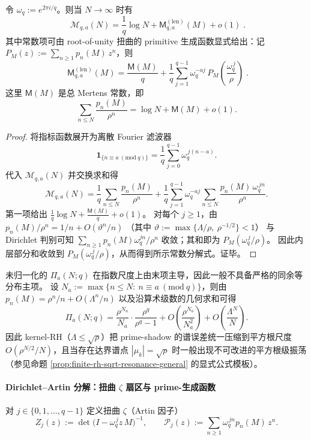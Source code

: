 \begin{theorem}\label{thm:zeta-length-modq-chebotarev-mertens}
令 \(\omega_q:=e^{2\pi i/q}\)。则当 \(N\to\infty\) 时有
\[
\boxed{\;
\mathcal{M}_{q,a}(N)=\frac{1}{q}\log N+\mathsf{M}^{(\mathrm{len})}_{q,a}(M)+o(1)\; }.
\]
其中常数项可由 root-of-unity 扭曲的 primitive 生成函数显式给出：记
\(
P_M(z):=\sum_{n\ge1}p_n(M)\,z^n
\)，则
\[
\boxed{\;
\mathsf{M}^{(\mathrm{len})}_{q,a}(M)
=\frac{\mathsf{M}(M)}{q}
+\frac{1}{q}\sum_{j=1}^{q-1}\omega_q^{-aj}\,P_M\!\left(\frac{\omega_q^{\,j}}{\rho}\right)\; }.
\]
这里 \(\mathsf{M}(M)\) 是总 Mertens 常数，即
\[
\sum_{n\le N}\frac{p_n(M)}{\rho^n}=\log N+\mathsf{M}(M)+o(1).
\]
\end{theorem}
\begin{proof}
将指标函数展开为离散 Fourier 滤波器
\[
\mathbf 1_{\{n\equiv a\ (\mathrm{mod}\ q)\}}
=\frac{1}{q}\sum_{j=0}^{q-1}\omega_q^{\,j(n-a)}.
\]
代入 \(\mathcal{M}_{q,a}(N)\) 并交换求和得
\[
\mathcal{M}_{q,a}(N)
=\frac{1}{q}\sum_{n\le N}\frac{p_n(M)}{\rho^n}
+\frac{1}{q}\sum_{j=1}^{q-1}\omega_q^{-aj}\sum_{n\le N}\frac{p_n(M)\,\omega_q^{\,jn}}{\rho^n}.
\]
第一项给出 \(\frac{1}{q}\log N+\frac{\mathsf{M}(M)}{q}+o(1)\)。
对每个 \(j\ge1\)，由
\(
p_n(M)/\rho^n
=1/n+O(\vartheta^n/n)
\)
（其中 \(\vartheta:=\max\{\Lambda/\rho,\ \rho^{-1/2}\}<1\)）
与 Dirichlet 判别可知 \(\sum_{n\ge1}p_n(M)\omega_q^{jn}/\rho^n\) 收敛；其和即为 \(P_M(\omega_q^{\,j}/\rho)\)。
因此内层部分和收敛到 \(P_M(\omega_q^{\,j}/\rho)\)，从而得到所示常数分解式。证毕。
\end{proof}

\begin{remark}\label{rem:zeta-length-modq-raw-endpoint-bias}
未归一化的 \(\Pi_a(N;q)\) 在指数尺度上由末项主导，因此一般不具备严格的同余等分布主项。
设 \(N_a:=\max\{n\le N:\ n\equiv a\ (\mathrm{mod}\ q)\}\)，则由
\(
p_n(M)=\rho^n/n+O(\Lambda^n/n)
\)
以及沿算术级数的几何求和可得
\[
\Pi_a(N;q)
=\frac{\rho^{N_a}}{N_a}\cdot\frac{\rho^q}{\rho^q-1}
+O\!\left(\frac{\rho^{N_a}}{N_a^2}\right)
+O\!\left(\frac{\Lambda^{N}}{N}\right).
\]
因此 kernel-RH（\(\Lambda\le \sqrt{\rho}\)）把 prime-shadow 的谱误差统一压缩到平方根尺度 \(O(\rho^{N/2}/N)\)，且当存在达界谱点 \(|\mu_k|=\sqrt{\rho}\) 时一般出现不可改进的平方根级振荡（参见命题 \ref{prop:finite-rh-sqrt-resonance-general} 的显式公式模板）。
\end{remark}

\paragraph{Dirichlet--Artin 分解：扭曲 \texorpdfstring{$\zeta$}{zeta} 扇区与 prime-生成函数}
对 \(j\in\{0,1,\dots,q-1\}\) 定义扭曲 \(\zeta\)（Artin 因子）
\[
Z_j(z):=\det\bigl(I-\omega_q^{\,j}z\,M\bigr)^{-1},
\qquad
\mathcal{P}_j(z):=\sum_{n\ge1}\omega_q^{\,jn}p_n(M)\,z^n.
\]

